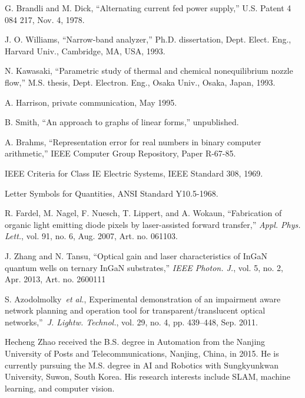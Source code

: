 \documentclass{ieeeaccess}
\begin{document}
\begin{thebibliography}{00}
 G. Brandli and M. Dick, ``Alternating current fed power supply,'' U.S. Patent 4 084 217, Nov. 4, 1978.

 J. O. Williams, ``Narrow-band analyzer,'' Ph.D. dissertation, Dept. Elect. Eng., Harvard Univ., Cambridge, MA, USA, 1993.

 N. Kawasaki, ``Parametric study of thermal and chemical nonequilibrium nozzle flow,'' M.S. thesis, Dept. Electron. Eng., Osaka Univ., Osaka, Japan, 1993.

 A. Harrison, private communication, May 1995.

 B. Smith, ``An approach to graphs of linear forms,'' unpublished.

 A. Brahms, ``Representation error for real numbers in binary computer arithmetic,'' IEEE Computer Group Repository, Paper R-67-85.

 IEEE Criteria for Class IE Electric Systems, IEEE Standard 308, 1969.

 Letter Symbols for Quantities, ANSI Standard Y10.5-1968.

 R. Fardel, M. Nagel, F. Nuesch, T. Lippert, and A. Wokaun, ``Fabrication of organic light emitting diode pixels by laser-assisted forward transfer,'' \emph{Appl. Phys. Lett.}, vol. 91, no. 6, Aug. 2007, Art. no. 061103.~

 J. Zhang and N. Tansu, ``Optical gain and laser characteristics of InGaN quantum wells on ternary InGaN substrates,'' \emph{IEEE Photon. J.}, vol. 5, no. 2, Apr. 2013, Art. no. 2600111

 S. Azodolmolky~\emph{et al.}, Experimental demonstration of an impairment aware network planning and operation tool for transparent/translucent optical networks,''~\emph{J. Lightw. Technol.}, vol. 29, no. 4, pp. 439--448, Sep. 2011.

\end{thebibliography}

\begin{IEEEbiography}{Hecheng Zhao} received the B.S. degree
in Automation from
the Nanjing University of Posts and Telecommunications,
Nanjing, China, in 2015. He is currently pursuing the M.S. degree in AI and Robotics with Sungkyunkwan University,
Suwon, South Korea.
His research interests include SLAM, machine learning, and computer vision.
\end{IEEEbiography}
\end{document}
